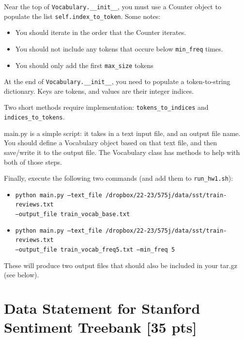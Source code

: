 \documentclass[11pt]{article}
\begin{document}
\vspace{2em}
 Near the top of \texttt{Vocabulary.\_\_init\_\_}, you must use a Counter object to populate the list \texttt{self.index\_to\_token}.  Some notes:
\begin{itemize}
  \item You should iterate in the order that the Counter iterates.
  \item You should not include any tokens that occure below \texttt{min\_freq} times.
  \item You should only add the first \texttt{max\_size} tokens
\end{itemize}

\vspace{2em}
  At the end of \texttt{Vocabulary.\_\_init\_\_}, you need to populate a token-to-string dictionary.  Keys are tokens, and values are their integer indices.

\vspace{2em}
  Two short methods require implementation: \texttt{tokens\_to\_indices} and \texttt{indices\_to\_tokens}.

\vspace{2em}
  main.py is a simple script: it takes in a text input file, and an output file name.  You should define a Vocabulary object based on that text file, and then save/write it to the output file.  The Vocabulary class has methods to help with both of those steps.

\vspace{2em}
  Finally, execute the following two commands (and add them to \texttt{run\_hw1.sh}):
\begin{itemize}
  \item \texttt{python main.py --text\_file /dropbox/22-23/575j/data/sst/train-reviews.txt \\--output\_file train\_vocab\_base.txt}
  \item \texttt{python main.py --text\_file /dropbox/22-23/575j/data/sst/train-reviews.txt \\--output\_file train\_vocab\_freq5.txt --min\_freq 5}
\end{itemize}
These will produce two output files that should also be included in your tar.gz (see below).


\section{Data Statement for Stanford Sentiment Treebank [35 pts]}
\end{document}

